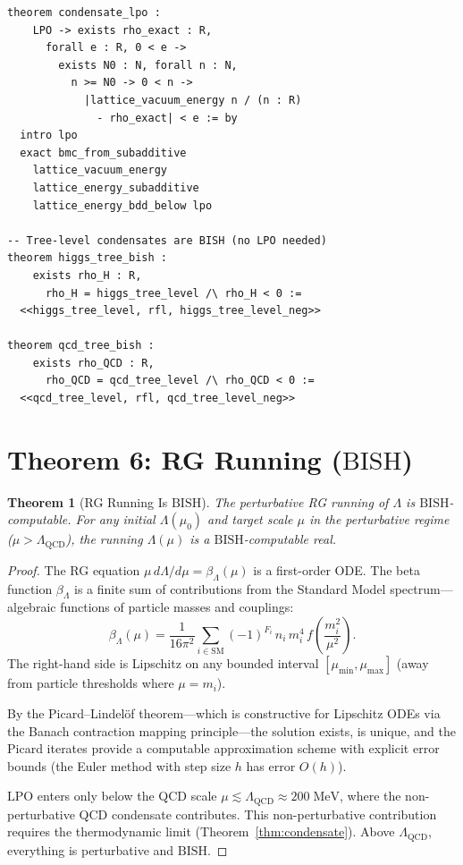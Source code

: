 \documentclass[11pt,a4paper]{article}
\theoremstyle{plain}
\newtheorem{theorem}{Theorem}[section]
\theoremstyle{definition}
\newcommand{\LPO}{\ensuremath{\mathrm{LPO}}}
\newcommand{\BISH}{\ensuremath{\mathrm{BISH}}}
\newcommand{\LQCD}{\Lambda_{\mathrm{QCD}}}
\begin{document}
\begin{lstlisting}[caption={Condensate is LPO: \texttt{CondensateLPO.lean}}]
theorem condensate_lpo :
    LPO -> exists rho_exact : R,
      forall e : R, 0 < e ->
        exists N0 : N, forall n : N,
          n >= N0 -> 0 < n ->
            |lattice_vacuum_energy n / (n : R)
              - rho_exact| < e := by
  intro lpo
  exact bmc_from_subadditive
    lattice_vacuum_energy
    lattice_energy_subadditive
    lattice_energy_bdd_below lpo

-- Tree-level condensates are BISH (no LPO needed)
theorem higgs_tree_bish :
    exists rho_H : R,
      rho_H = higgs_tree_level /\ rho_H < 0 :=
  <<higgs_tree_level, rfl, higgs_tree_level_neg>>

theorem qcd_tree_bish :
    exists rho_QCD : R,
      rho_QCD = qcd_tree_level /\ rho_QCD < 0 :=
  <<qcd_tree_level, rfl, qcd_tree_level_neg>>
\end{lstlisting}

\section{Theorem 6: RG Running ($\BISH$)}\label{sec:rg}

\begin{theorem}[RG Running Is $\BISH$]\label{thm:rg}
The perturbative RG running of $\Lambda$ is $\BISH$-computable.
For any initial $\Lambda(\mu_0)$ and target scale $\mu$ in the
perturbative regime ($\mu > \LQCD$), the running $\Lambda(\mu)$
is a $\BISH$-computable real.
\end{theorem}

\begin{proof}
The RG equation $\mu\, d\Lambda/d\mu = \beta_\Lambda(\mu)$ is a
first-order ODE.  The beta function $\beta_\Lambda$ is a finite
sum of contributions from the Standard Model spectrum---algebraic
functions of particle masses and couplings:
\[
  \beta_\Lambda(\mu) = \frac{1}{16\pi^2}\sum_{i \in \mathrm{SM}}
  (-1)^{F_i}\, n_i\, m_i^4\,
  f\!\left(\frac{m_i^2}{\mu^2}\right).
\]
The right-hand side is Lipschitz on any bounded interval
$[\mu_{\min}, \mu_{\max}]$ (away from particle thresholds where
$\mu = m_i$).

By the Picard--Lindel\"of theorem---which is constructive for
Lipschitz ODEs via the Banach contraction mapping principle---the
solution exists, is unique, and the Picard iterates provide a
computable approximation scheme with explicit error bounds
(the Euler method with step size $h$ has error $O(h)$).

$\LPO$ enters only below the QCD scale $\mu \lesssim \LQCD \approx
200\;\mathrm{MeV}$, where the non-perturbative QCD condensate
contributes.  This non-perturbative contribution requires the
thermodynamic limit (Theorem~\ref{thm:condensate}).
Above $\LQCD$, everything is perturbative and $\BISH$.
\end{proof}
\end{document}
